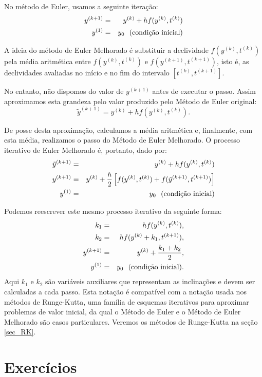 No método de Euler, usamos a seguinte iteração:
\begin{eqnarray*}
y^{(k+1)}&=&y^{(k)}+hf(y^{(k)},t^{(k)})\\
y^{(1)}&=&y_0~~ \hbox{(condição inicial)}
\end{eqnarray*}

A ideia do método de Euler Melhorado é substituir a declividade  $f(y^{(k)},t^{(k)})$ pela média aritmética entre $f(y^{(k)},t^{(k)})$ e $f(y^{(k+1)},t^{(k+1)})$, isto é, as declividades avaliadas no início e no fim do intervalo $[t^{(k)},t^{(k+1)}]$.

No entanto, não dispomos do valor de $y^{(k+1)}$ antes de executar o passo. Assim aproximamos esta grandeza pelo valor produzido pelo Método de Euler original:
$$\tilde{y}^{(k+1)}=y^{(k)}+hf(y^{(k)},t^{(k)}).$$

De posse desta aproximação, calculamos a média aritmética e, finalmente, com esta média, realizamos o passo do Método de Euler Melhorado. O processo iterativo de Euler Melhorado é, portanto, dado por:
\begin{eqnarray*}
\tilde{y}^{(k+1)}&=&y^{(k)}+hf(y^{(k)},t^{(k)})\\
y^{(k+1)}&=&y^{(k)}+\frac{h}{2}\left[f(y^{(k)},t^{(k)})+f(\tilde{y}^{(k+1)},t^{(k+1)})\right]\\
y^{(1)}&=&y_0~~ \hbox{(condição inicial)}
\end{eqnarray*}

Podemos reescrever este mesmo processo iterativo da seguinte forma:
\begin{eqnarray*}
k_1&=&hf(y^{(k)},t^{(k)}),\\
k_2&=&hf(y^{(k)}+k_1,t^{(k+1)}),\\
y^{(k+1)}&=&y^{(k)}+\frac{k_1+k_2}{2},\\
y^{(1)}&=&y_0~~ \hbox{(condição inicial)}.
\end{eqnarray*}
Aqui $k_1$ e $k_2$ são variáveis auxiliares que representam as inclinações e devem ser calculadas a cada passo. Esta notação é compatível com a notação usada nos métodos de Runge-Kutta, uma família de esquemas iterativos para aproximar problemas de valor inicial, da qual o Método de Euler e o Método de Euler Melhorado são casos particulares. Veremos os métodos de Runge-Kutta na seção \ref{sec_RK}.


\section*{Exercícios}

